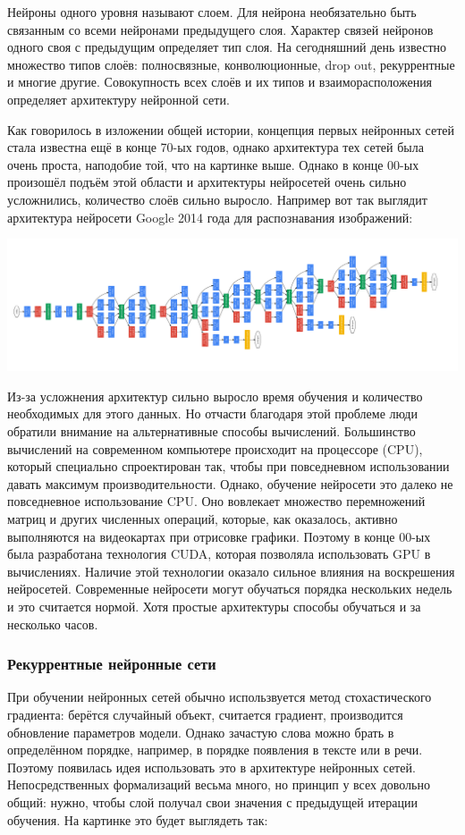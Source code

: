 \documentclass[a4paper,14pt]{extarticle}
\begin{document}
Нейроны одного уровня называют слоем. Для нейрона необязательно быть связанным со всеми нейронами предыдущего слоя. Характер связей нейронов одного своя с предыдущим определяет тип слоя. На сегодняшний день известно множество типов слоёв: полносвязные, конволюционные, drop out, рекуррентные и многие другие. Совокупность всех слоёв и их типов и взаиморасположения определяет архитектуру нейронной сети.

Как говорилось в изложении общей истории, концепция первых нейронных сетей стала известна ещё в конце 70-ых годов, однако архитектура тех сетей была очень проста, наподобие той, что на картинке выше. Однако в конце 00-ых произошёл подъём этой области и архитектуры нейросетей очень сильно усложнились, количество слоёв сильно выросло. Например вот так выглядит архитектура нейросети Google 2014 года для распознавания изображений:

\medskip

\includegraphics[width=1.0\linewidth]{net.png}

Из-за усложнения архитектур сильно выросло время обучения и количество необходимых для этого данных. Но отчасти благодаря этой проблеме люди обратили внимание на альтернативные способы вычислений. Большинство вычислений на современном компьютере происходит на процессоре (CPU), который специально спроектирован так, чтобы при повседневном использовании давать максимум производительности. Однако, обучение нейросети это далеко не повседневное использование CPU. Оно вовлекает множество перемножений матриц и других численных операций, которые, как оказалось, активно выполняются на видеокартах при отрисовке графики. Поэтому в конце 00-ых была разработана технология CUDA, которая позволяла использовать GPU в вычислениях. Наличие этой технологии оказало сильное влияния на воскрешения нейросетей. Современные нейросети могут обучаться порядка нескольких недель и это считается нормой. Хотя простые архитектуры способы обучаться и за несколько часов. 

\subsubsection{Рекуррентные нейронные сети}
При обучении нейронных сетей обычно использвуется метод стохастического градиента: берётся случайный объект, считается градиент, производится обновление параметров модели. Однако зачастую слова можно брать в определённом порядке, например, в порядке появления в тексте или в речи. Поэтому появилась идея использовать это в архитектуре нейронных сетей. Непосредственных формализаций весьма много, но принцип у всех довольно общий: нужно, чтобы слой получал свои значения с предыдущей итерации обучения. На картинке это будет выглядеть так:
\end{document}
